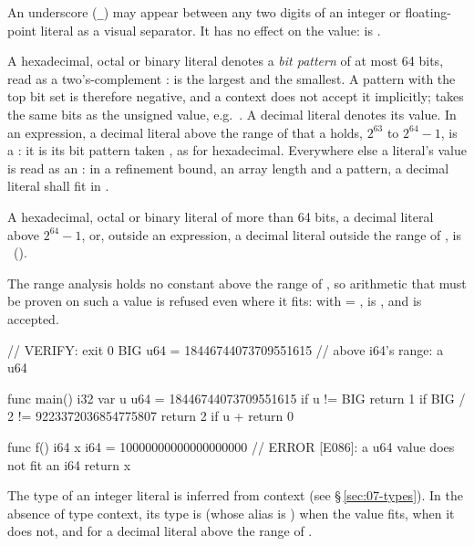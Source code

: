 \pnum
An underscore (\texttt{\_}) may appear between any two digits of an integer or
floating-point literal as a visual separator.  It has no effect on the value:
 is .

\pnum
A hexadecimal, octal or binary literal denotes a \emph{bit pattern} of at most 64 bits, read as a
two's-complement :  is the largest  and
 the smallest.  A pattern with the top bit set is therefore
negative, and a  context does not accept it implicitly;  takes the same bits
as the unsigned value, e.g.\ .  A decimal literal denotes its
value.  In an expression, a decimal literal above the range of  that a  holds,
\(2^{63}\) to \(2^{64} - 1\), is a : it is its bit pattern taken , as for
hexadecimal.  Everywhere else a literal's value is read as an : in a refinement bound,
an array length and a pattern, a decimal literal shall fit in .

\begin{constraint}
  A hexadecimal, octal or binary literal of more than 64 bits, a decimal literal above
  \(2^{64} - 1\), or, outside an expression, a decimal literal outside the range of ,
  is \illformed{}~().
\end{constraint}

\pnum
The range analysis holds no constant above the range of , so arithmetic that must
be proven on such a value is refused even where it fits: with  =
,  is , and  is accepted.

\begin{laincode}
// VERIFY: exit 0
BIG u64 = 18446744073709551615          // above i64's range: a u64

func main() i32 {
    var u u64 = 18446744073709551615
    if u != BIG { return 1 }
    if BIG / 2 != 9223372036854775807 { return 2 }
    if u +%
    return 0
}
\end{laincode}

\begin{laincode}
func f() i64 {
    x i64 = 10000000000000000000    // ERROR [E086]: a u64 value does not fit an i64
    return x
}
\end{laincode}

\pnum
The type of an integer literal is inferred from context (see
\S\,\ref{sec:07-types}).  In the absence of type context, its type is  (whose alias
is ) when the value fits,  when it does not, and  for a decimal
literal above the range of .

